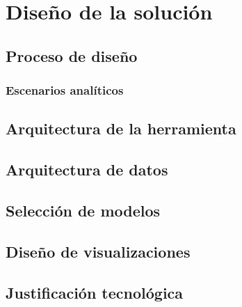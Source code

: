 \chapter{Diseño de la solución}
\label{chapter:design}

\Blindtext

\section{Proceso de diseño}
\label{chapter:proceso-diseño}

\Blindtext

\subsection{Escenarios analíticos}

\Blindtext

\section{Arquitectura de la herramienta}
\label{section:arquitectura}

\Blindtext

\section{Arquitectura de datos}
\label{section:arquitectura-datos}

\Blindtext

\section{Selección de modelos}
\label{section:seleccion-modelos}

\Blindtext

\section{Diseño de visualizaciones}
\label{section:diseño-viz}

\Blindtext

\section{Justificación tecnológica}
\label{section:justificacion-tecnologica}

\Blindtext

